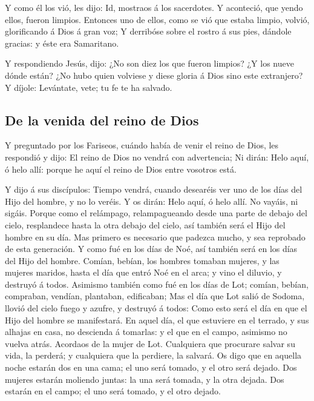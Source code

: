  Y como él los vió, les dijo: Id, mostraos á los
sacerdotes. Y aconteció, que yendo ellos, fueron limpios.
 Entonces uno de ellos, como se vió que estaba limpio,
volvió, glorificando á Dios á gran voz;  Y derribóse
sobre el rostro á sus pies, dándole gracias: y éste era Samaritano.

 Y respondiendo Jesús, dijo: ¿No son diez los que fueron
limpios? ¿Y los nueve dónde están?  ¿No hubo quien
volviese y diese gloria á Dios sino este extranjero?  Y
díjole: Levántate, vete; tu fe te ha salvado.

\hypertarget{de-la-venida-del-reino-de-dios}{%
\subsection{De la venida del reino de
Dios}\label{de-la-venida-del-reino-de-dios}}

 Y preguntado por los Fariseos, cuándo había de venir el
reino de Dios, les respondió y dijo: El reino de Dios no vendrá con
advertencia;  Ni dirán: Helo aquí, ó helo allí: porque he
aquí el reino de Dios entre vosotros está.

 Y dijo á sus discípulos: Tiempo vendrá, cuando desearéis
ver uno de los días del Hijo del hombre, y no lo veréis. 
Y os dirán: Helo aquí, ó helo allí. No vayáis, ni sigáis.
 Porque como el relámpago, relampagueando desde una parte
de debajo del cielo, resplandece hasta la otra debajo del cielo, así
también será el Hijo del hombre en su día.  Mas primero
es necesario que padezca mucho, y sea reprobado de esta generación.
 Y como fué en los días de Noé, así también será en los
días del Hijo del hombre.  Comían, bebían, los hombres
tomaban mujeres, y las mujeres maridos, hasta el día que entró Noé en el
arca; y vino el diluvio, y destruyó á todos.  Asimismo
también como fué en los días de Lot; comían, bebían, compraban, vendían,
plantaban, edificaban;  Mas el día que Lot salió de
Sodoma, llovió del cielo fuego y azufre, y destruyó á todos:
 Como esto será el día en que el Hijo del hombre se
manifestará.  En aquel día, el que estuviere en el
terrado, y sus alhajas en casa, no descienda á tomarlas: y el que en el
campo, asimismo no vuelva atrás.  Acordaos de la mujer de
Lot.  Cualquiera que procurare salvar su vida, la
perderá; y cualquiera que la perdiere, la salvará.  Os
digo que en aquella noche estarán dos en una cama; el uno será tomado, y
el otro será dejado.  Dos mujeres estarán moliendo
juntas: la una será tomada, y la otra dejada.  Dos
estarán en el campo; el uno será tomado, y el otro dejado.

